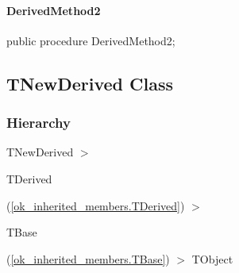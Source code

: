 \documentclass{report}
\newif\ifpdf
\begin{document}
\paragraph*{DerivedMethod2}\hspace*{\fill}

\label{ok_inherited_members.TDerived-DerivedMethod2}
\begin{list}{}{
\setlength{\itemindent}{0cm}
\setlength{\listparindent}{0cm}
\setlength{\leftmargin}{\evensidemargin}
\addtolength{\leftmargin}{\tmplength}
\settowidth{\labelsep}{X}
\addtolength{\leftmargin}{\labelsep}
\setlength{\labelwidth}{\tmplength}
}
\item[\textbf{Declaration}\hfill]
\ifpdf
\begin{flushleft}
\fi
\begin{ttfamily}
public procedure DerivedMethod2;\end{ttfamily}

\ifpdf
\end{flushleft}
\fi

\end{list}
\ifpdf
\subsection*{\large{\textbf{TNewDerived Class}}\normalsize\hspace{1ex}\hrulefill}
\else
\subsection*{TNewDerived Class}
\fi
\label{ok_inherited_members.TNewDerived}
\subsubsection*{\large{\textbf{Hierarchy}}\normalsize\hspace{1ex}\hfill}
TNewDerived {$>$} \begin{ttfamily}TDerived\end{ttfamily}(\ref{ok_inherited_members.TDerived}) {$>$} \begin{ttfamily}TBase\end{ttfamily}(\ref{ok_inherited_members.TBase}) {$>$} 
TObject
\end{document}
